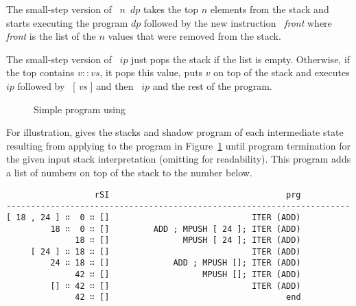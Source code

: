 The small-step version of ~$n$~$dp$ takes the top $n$ elements from the stack
and starts executing the program $dp$ followed by 
the new instruction ~\textit{front} where
\textit{front} is the list of the $n$ values that were removed from
the stack.
\ConcreteprogStepDIP

The small-step version of ~$ip$ just pops the stack if the
list is empty.
Otherwise, if the top contains $v :: vs$, it pops this value, puts $v$
on top of the stack and executes $ip$ followed by
~[\textit{ vs }] and then ~$ip$ and the rest of
the program.
\ConcreteprogStepITER

\begin{figure}[tp]
  \ConcreteExampleITER
  \caption{Simple program using }
  \label{fig:ITER-ADD}
\end{figure}
For illustration, 
 gives the stacks and shadow program of
each intermediate state resulting from applying  to
the program in Figure~\ref{fig:ITER-ADD} until program termination
for the given input stack interpretation (omitting  for
readability).
This program adds a list of numbers on top of the stack to the number below.

\begin{table}[tp]
\begin{verbatim}
                  rSI                                    prg
----------------------------------------------------------------------
[ 18 , 24 ] ∷  0 ∷ []                             ITER (ADD)
         18 ∷  0 ∷ []         ADD ; MPUSH [ 24 ]; ITER (ADD)
              18 ∷ []               MPUSH [ 24 ]; ITER (ADD)
     [ 24 ] ∷ 18 ∷ []                             ITER (ADD)
         24 ∷ 18 ∷ []             ADD ; MPUSH []; ITER (ADD)
              42 ∷ []                   MPUSH []; ITER (ADD)
         [] ∷ 42 ∷ []                             ITER (ADD)
              42 ∷ []                                    end
\end{verbatim}
\caption{Program states during execution of Figure~\ref{fig:ITER-ADD}}
\label{prog-step:ITER-ADD}
\end{table}



